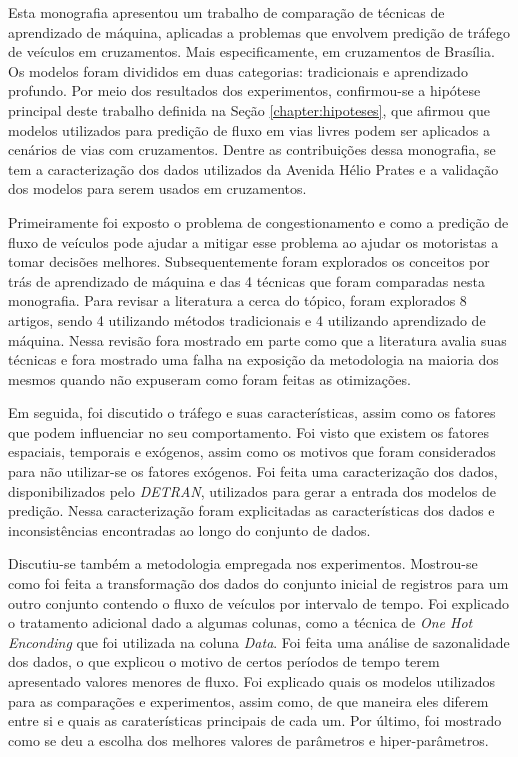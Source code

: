 Esta monografia apresentou um trabalho de comparação de técnicas de aprendizado de máquina, aplicadas a problemas que envolvem predição de tráfego de veículos em cruzamentos. Mais especificamente, em cruzamentos de Brasília. Os modelos foram divididos em duas categorias: tradicionais e aprendizado profundo. Por meio dos resultados dos experimentos, confirmou-se a hipótese principal deste trabalho definida na Seção \ref{chapter:hipoteses}, que afirmou que modelos utilizados para predição de fluxo em vias livres podem ser aplicados a cenários de vias com cruzamentos. Dentre as contribuições dessa monografia, se tem a caracterização dos dados utilizados da Avenida Hélio Prates e a validação dos modelos para serem usados em cruzamentos.

Primeiramente foi exposto o problema de congestionamento e como a predição de fluxo de veículos pode ajudar a mitigar esse problema ao ajudar os motoristas a tomar decisões melhores. Subsequentemente foram explorados os conceitos por trás de aprendizado de máquina e das 4 técnicas que foram comparadas nesta monografia. Para revisar a literatura a cerca do tópico, foram explorados 8 artigos, sendo 4 utilizando métodos tradicionais e 4 utilizando aprendizado de máquina. Nessa revisão fora mostrado em parte como que a literatura avalia suas técnicas e fora mostrado uma falha na exposição da metodologia na maioria dos mesmos quando não expuseram como foram feitas as otimizações.  

Em seguida, foi discutido o tráfego e suas características, assim como os fatores que podem influenciar no seu comportamento. Foi visto que existem os fatores espaciais, temporais e exógenos, assim como os motivos que foram considerados para não utilizar-se os fatores exógenos. Foi feita uma caracterização dos dados, disponibilizados pelo \textit{\acrshort{DETRAN}}, utilizados para gerar a entrada dos modelos de predição. Nessa caracterização foram explicitadas as características dos dados e inconsistências encontradas ao longo do conjunto de dados.

Discutiu-se também a metodologia empregada nos experimentos. Mostrou-se como foi feita a transformação dos dados do conjunto inicial de registros para um outro conjunto contendo o fluxo de veículos por intervalo de tempo. Foi explicado o tratamento adicional dado a algumas colunas, como a técnica de \textit{One Hot Enconding} que foi utilizada na coluna \textit{Data}. Foi feita uma análise de sazonalidade dos dados, o que explicou o motivo de certos períodos de tempo terem apresentado valores menores de fluxo. Foi explicado quais os modelos utilizados para as comparações e experimentos, assim como, de que maneira eles diferem entre si e quais as caraterísticas principais de cada um. Por último, foi mostrado como se deu a escolha dos melhores valores de parâmetros e hiper-parâmetros.

